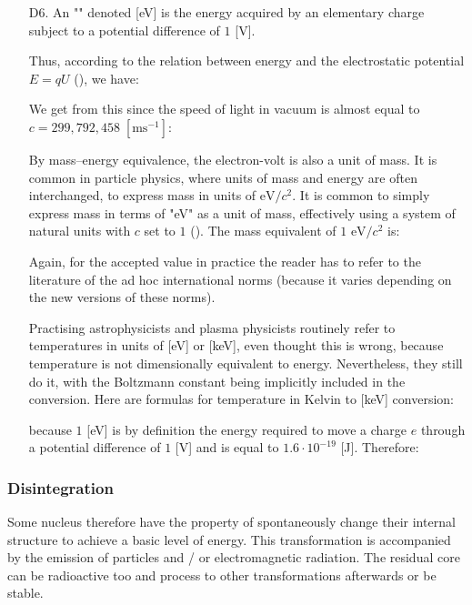 \begin{enumerate}
	  \item[D6.] An "\label{electron volt}" denoted [eV] is the energy acquired by an elementary charge subject to a potential difference of $1$ [V].
	  
	  Thus, according to the relation between energy and the electrostatic potential $E=qU$ (), we have:
	
	We get from this since the speed of light in vacuum is almost equal to $c=299,792,458\;[\text{ms}^{-1}]$:
	
	  
	 By mass–energy equivalence, the electron-volt is also a unit of mass. It is common in particle physics, where units of mass and energy are often interchanged, to express mass in units of $\text{eV}/c^2$. It is common to simply express mass in terms of "eV" as a unit of mass, effectively using a system of natural units with $c$ set to $1$ (). The mass equivalent of $1$ $\text{eV}/c^2$ is:
	
	Again, for the accepted value in practice the reader has to refer to the literature of the ad hoc international norms (because it varies depending on the new versions of these norms).
	\begin{tcolorbox}[title=Remark,colframe=black,arc=10pt]
	Practising astrophysicists and plasma physicists routinely refer to temperatures in units of [eV] or [keV], even thought this is wrong, because temperature is not dimensionally equivalent to energy. Nevertheless, they still do it, with the Boltzmann constant being implicitly included in the conversion. Here are formulas for temperature in Kelvin to [keV] conversion:
	
	because $1$ [eV] is by definition the energy required to move a charge $e$ through a potential difference of $1$ [V] and is equal to $1.6\cdot 10^{-19}$ [J]. Therefore:
	
	\end{tcolorbox}
	\end{enumerate}
	
	\pagebreak
	\subsubsection{Disintegration}
	Some nucleus therefore have the property of spontaneously change their internal structure to achieve a basic level of energy. This transformation is accompanied by the emission of particles and / or electromagnetic radiation. The residual core can be radioactive too and process to other transformations afterwards or be stable.

